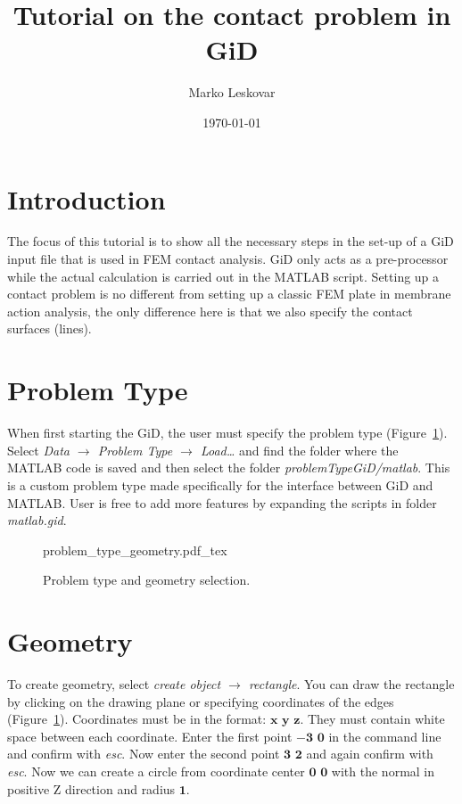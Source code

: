 \documentclass[10pt,a4paper]{article}
\title{Tutorial on the contact problem in GiD}
\author{Marko Leskovar}
\date{\today}
\begin{document}
\maketitle

\section{Introduction}

The focus of this tutorial is to show all the necessary steps in the set-up of a GiD input file that is used in FEM contact analysis. GiD only acts as a pre-processor while the actual calculation is carried out in the MATLAB script. Setting up a contact problem is no different from setting up a classic FEM plate in membrane action analysis, the only difference here is that we also specify the contact surfaces (lines).

\section{Problem Type}

When first starting the GiD, the user must specify the problem type (Figure~\ref{im:Problem_type_geometry}). Select \textit{Data $\rightarrow$ Problem Type $\rightarrow$ Load…} and find the folder where the MATLAB code is saved and then select the folder \textit{problemTypeGiD/matlab}. This is a custom problem type made specifically for the interface between GiD and MATLAB. User is free to add more features by expanding the scripts in folder \textit{matlab.gid}.

\begin{figure}[ht]
	\centering
	\footnotesize
    \def\svgwidth{0.9\textwidth}{problem_type_geometry.pdf_tex}
	\caption{Problem type and geometry selection.}
	\label{im:Problem_type_geometry}
\end{figure}


\section{Geometry}

To create geometry, select \textit{create object $\rightarrow$ rectangle}. You can draw the rectangle by clicking on the drawing plane or specifying coordinates of the edges (Figure~\ref{im:Problem_type_geometry}). Coordinates must be in the format: $\mathbf{x}$ $\mathbf{y}$ $\mathbf{z}$. They must contain white space between each coordinate. Enter the first point $\mathbf{-3}$ $\mathbf{0}$ in the command line and confirm with \textit{esc}. Now enter the second point $\mathbf{3}$ $\mathbf{2}$ and again confirm with \textit{esc}. Now we can create a circle from coordinate center $\mathbf{0}$ $\mathbf{0}$ with the normal in positive Z direction and radius $\mathbf{1}$. \\
\end{document}
